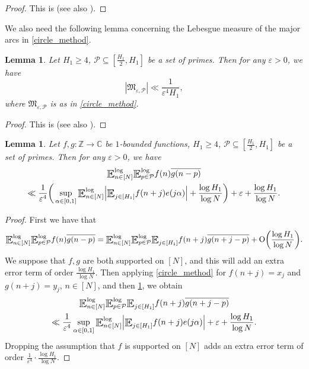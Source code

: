 \documentclass[letter,11pt]{article}
\theoremstyle{plain} %
\newtheorem{lemma}[theorem]{Lemma}
\theoremstyle{definition} %
\theoremstyle{plain}
\theoremstyle{plain}
\theoremstyle{plain}
\numberwithin{equation}{section}
\newcommand{\Oh}{{\mathrm O}}
\newcommand{\Z}{\mathbb{Z}}
\newcommand{\C}{\mathbb{C}}
\renewcommand{\epsilon}{\varepsilon}
\renewcommand{\geq}{\geqslant}
\renewcommand{\subset}{\subseteq}
\newcommand{\E}{\raisebox{-0.4ex}{\scalebox{1.4}[1.3]{$\mathbb{E}$}}}
\newcommand{\Esub}[1]{\raisebox{-0.4ex}{\scalebox{1.4}[1.3]{$\mathbb{E}$}}\raisebox{-0.35ex}{\ensuremath{_{\scriptstyle #1}}}}
\newcommand{\logE}{{\E}^{\log}}
\newcommand{\1}{\mathbbm{1}}
\newcommand{\Pc}{\mathcal{P}}
\begin{document}
\begin{proof}
This is \cite[Lemma 8.1]{helf_radz} (see also \cite[Lemma 5.11]{Helf_Ubis}).
\end{proof}

We also need the following lemma concerning the Lebesgue measure of the major arcs in \cref{circle_method}.

\begin{lemma}\label{major_arcs_bound}
Let $H_1\geq 4$, $\Pc\subset[\frac{H_1}{2},H_1]$ be a set of primes. Then for any $\epsilon>0$, we have
$$|\mathfrak{M}_{\epsilon,\Pc}| \ll \frac{1}{\epsilon^4 H_1},$$
where $\mathfrak{M}_{\epsilon,\Pc}$ is as in \cref{circle_method}.
\end{lemma}

\begin{proof}
    This is \cite[Lemma 8.2]{helf_radz} (see also \cite[Lemma 5.12]{Helf_Ubis}).
\end{proof}

\begin{lemma}\label{bound_dyadic_set}
    Let $f,g\colon\Z\to\C$ be $1$-bounded functions, $H_1\geq 4$, $\Pc\subset[\frac{H_1}{2},H_1]$ be a set of primes. Then for any $\epsilon>0$, we have
    \begin{multline*}
        \logE_{n\in[N]}\logE_{p\in\Pc} f(n)\overline{g(n-p)} \\
        \ll \frac{1}{\epsilon^4}\bigg(\sup_{\alpha\in[0,1]}\logE_{n\in[N]}\Big|\Esub{j\in[H_1]}f(n+j)e(j\alpha)\Big| + \frac{\log{H_1}}{\log{N}}\bigg) + \epsilon + \frac{\log{H_1}}{\log{N}}.
    \end{multline*}
\end{lemma}

\begin{proof}
    First we have that
    $$\logE_{n\in[N]}\logE_{p\in\Pc} f(n)\overline{g(n-p)}
    = 
    \logE_{n\in[N]}\logE_{p\in\Pc}\Esub{j\in[H_1]}f(n+j)\overline{g(n+j-p)} + \Oh\bigg(\frac{\log{H_1}}{\log{N}}\bigg).$$
    We suppose that $f,g$ are both supported on $[N]$, and this will add an extra error term of order $\frac{\log{H_1}}{\log{N}}$. Then applying \cref{circle_method} for $f(n+j) = x_j$ and $g(n+j) = y_j$, $n\in[N]$, and then \cref{major_arcs_bound}, we obtain        
    \begin{multline*}
        \logE_{n\in[N]}\logE_{p\in\Pc}\Esub{j\in[H_1]}f(n+j)\overline{g(n+j-p)} \\
        \ll \frac{1}{\epsilon^4}\sup_{\alpha\in[0,1]}\logE_{n\in[N]}\Big|\Esub{j\in[H_1]}f(n+j)e(j\alpha)\Big| + \epsilon + \frac{\log{H_1}}{\log{N}}.
    \end{multline*}
    Dropping the assumption that $f$ is supported on $[N]$ adds an extra error term of order $\frac{1}{\epsilon^4}\cdot\frac{\log{H_1}}{\log{N}}$.
\end{proof}
\end{document}
